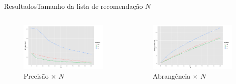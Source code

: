 \begin{frame}{Resultados}{Tamanho da lista de recomendação $N$}

\begin{columns}[b]
\begin{figure}[ht]
    \begin{center}
    \includegraphics[width=1.1\textwidth]{../img/precision_N}
    \end{center}
    \caption{Precisão $\times$ $N$}
    \label{fig:precision_N}
\end{figure}


\begin{figure}[ht]
    \begin{center}
    \includegraphics[width=1.1\textwidth]{../img/recall_N}
    \end{center}
    \caption{Abrangência $\times$ $N$}
    \label{fig:recall_N}
\end{figure}
\end{columns}
\end{frame}

